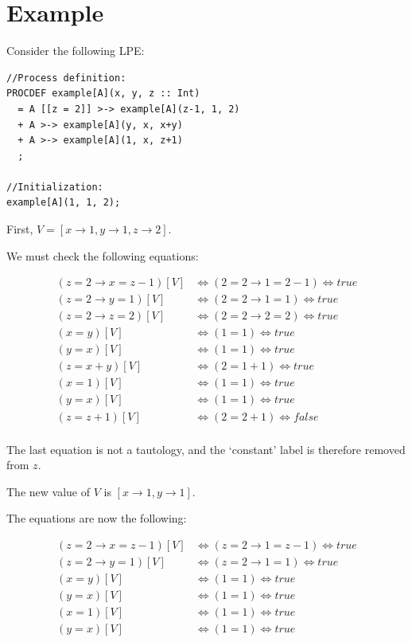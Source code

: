 \section{Example}

Consider the following LPE:

\begin{lstlisting}
//Process definition:
PROCDEF example[A](x, y, z :: Int)
  = A [[z = 2]] >-> example[A](z-1, 1, 2)
  + A >-> example[A](y, x, x+y)
  + A >-> example[A](1, x, z+1)
  ;

//Initialization:
example[A](1, 1, 2);
\end{lstlisting}

First, $V = [ x \rightarrow 1, y \rightarrow 1, z \rightarrow 2 ]$.

We must check the following equations:

\begin{align*}
(z = 2 \rightarrow x = z-1)[V] &\Leftrightarrow (2 = 2 \rightarrow 1 = 2-1) \Leftrightarrow \textit{true} \\
(z = 2 \rightarrow y = 1)[V] &\Leftrightarrow (2 = 2 \rightarrow 1 = 1) \Leftrightarrow \textit{true} \\
(z = 2 \rightarrow z = 2)[V] &\Leftrightarrow (2 = 2 \rightarrow 2 = 2) \Leftrightarrow \textit{true} \\
(x = y)[V] &\Leftrightarrow (1 = 1) \Leftrightarrow \textit{true} \\
(y = x)[V] &\Leftrightarrow (1 = 1) \Leftrightarrow \textit{true} \\
(z = x+y)[V] &\Leftrightarrow (2 = 1+1) \Leftrightarrow \textit{true} \\
(x = 1)[V] &\Leftrightarrow (1 = 1) \Leftrightarrow \textit{true} \\
(y = x)[V] &\Leftrightarrow (1 = 1) \Leftrightarrow \textit{true} \\
(z = z+1)[V] &\Leftrightarrow (2 = 2+1) \Leftrightarrow \textit{false} \\
\end{align*}

The last equation is not a tautology, and the `constant' label is therefore removed from $z$.

The new value of $V$ is $[ x \rightarrow 1, y \rightarrow 1 ]$.

\clearpage
The equations are now the following:

\begin{align*}
(z = 2 \rightarrow x = z-1)[V] &\Leftrightarrow (z = 2 \rightarrow 1 = z-1) \Leftrightarrow \textit{true} \\
(z = 2 \rightarrow y = 1)[V] &\Leftrightarrow (z = 2 \rightarrow 1 = 1) \Leftrightarrow \textit{true} \\
(x = y)[V] &\Leftrightarrow (1 = 1) \Leftrightarrow \textit{true} \\
(y = x)[V] &\Leftrightarrow (1 = 1) \Leftrightarrow \textit{true} \\
(x = 1)[V] &\Leftrightarrow (1 = 1) \Leftrightarrow \textit{true} \\
(y = x)[V] &\Leftrightarrow (1 = 1) \Leftrightarrow \textit{true} \\
\end{align*}

